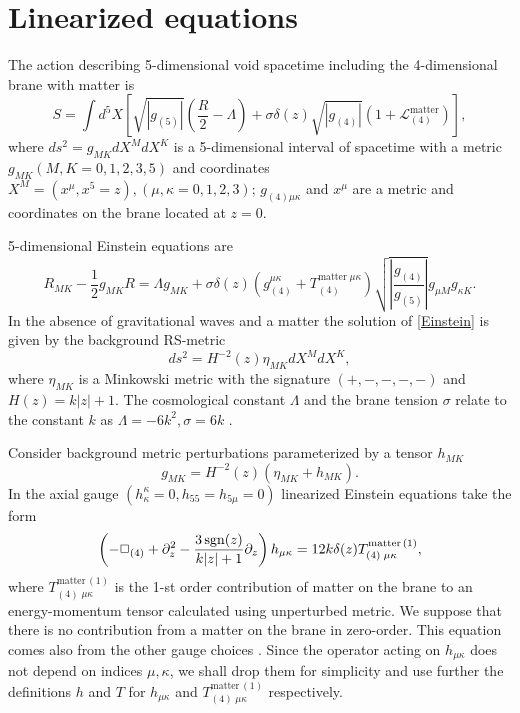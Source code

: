\documentclass[letterpaper,12pt]{article}
\newcommand*{\sgn}{\mathop{\rm sgn}\nolimits}
\begin{document}
\section{Linearized equations}\label{equations}
The action describing 5-dimensional void spacetime including the
4-dimensional  brane with matter is
\begin{equation}
\label{action}
 S = \int d^5 X\left[\sqrt{|g_{(5)}|}
\left(\frac{R}{2}-\Lambda\right)
 + \sigma\delta(z)\sqrt{|g_{(4)}|}
  (1 +\mathcal{L}_{(4)}^{\text{matter}})\right],
\end{equation}
where $ds^2=g_{MK}dX^MdX^K$ is a 5-dimensional interval of
spacetime with a metric $g_{MK} (M,K=0,1,2,3,5)$ and coordinates
$X^M=(x^\mu,x^5=z), (\mu,\kappa=0,1,2,3)$; $g_{(4)\mu\kappa}$ and
$x^\mu$ are a metric and coordinates on the brane located at
$z=0$.

 5-dimensional Einstein equations are
\begin{equation}
\label{Einstein}
 R_{MK}-\frac{1}{2}g_{MK}R= \Lambda g_{MK}+\sigma \delta(z)
 \left( g_{(4)}^{\mu\kappa}+
T_{(4)}^{\text{matter}\;\mu\kappa}\right)
\sqrt{\left|\frac{g_{(4)}}{g_{(5)}}\right|}g_{\mu M}g_{\kappa K}.
\end{equation}
In the absence of gravitational waves and a matter the solution of
\eqref{Einstein} is given by the background RS-metric
\begin{equation}
\label{RSmetric}ds^2=H^{-2}(z)\eta_{MK}dX^MdX^K,
\end{equation}
where $\eta_{MK}$ is a  Minkowski metric with the signature
$(+,-,-,-,-)$ and $H(z)=k|z|+1$. The cosmological constant
$\Lambda$ and the brane tension $\sigma$ relate to the constant
$k$ as $\Lambda=-6k^2,\sigma=6k$ \cite{Randall99a}.

Consider  background metric perturbations parameterized by a
tensor $h_{MK}$
\begin {equation}
\label{PrtbMetric}g_{MK}=H^{-2}(z)(\eta_{MK}+h_{MK}).
\end{equation}
In the axial gauge
\cite{Randall99a,Randall99b,Garriga99,Giddings00}$ (
h^\kappa_\kappa=0,h_{55}=h_{5\mu}=0)$ linearized Einstein
equations take the form
\begin{equation}
\label{LinEq} \left(-{\Box}_{(4)} + \partial_z^2 - \frac{3\sgn(z)
}{k|z|+1}\partial_z\right)h_{\mu\kappa} =
12k\delta(z)T_{(4)\;\mu\kappa}^{\text{matter}\,(1)},
\end{equation}
where $T_{(4)\;\mu\kappa}^{\text{matter}\,(1)}$ is the 1-st order
contribution of matter on the brane to an energy-momentum tensor
calculated using unperturbed metric. We suppose that there is no
contribution  from a matter on the brane  in zero-order. This
equation comes also from the other gauge choices \cite{Aref'eva}.
Since the operator acting on $h_{\mu\kappa}$ does not depend on
indices $\mu,\kappa$, we shall drop them for simplicity and use
further the definitions $h$ and $T$ for $h_{\mu\kappa}$ and
$T_{(4)\;\mu\kappa}^{\text{matter}\,(1)}$ respectively.
\end{document}
